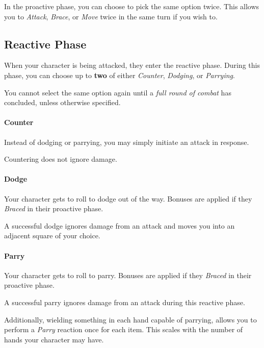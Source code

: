 \begin{note} 
  In the proactive phase, you can choose to pick the same option twice. 
  This allows you to \textit{Attack}, \textit{Brace}, or \textit{Move} twice in the same turn if you wish to.
\end{note}

\subsection{Reactive Phase}
When your character is being attacked, they enter the reactive phase.
During this phase, you can choose up to \textbf{two} of either \textit{Counter}, \textit{Dodging}, or \textit{Parrying}.

You cannot select the same option again until a \textit{full round of combat} has concluded, unless otherwise specified.

\paragraph{Counter}
Instead of dodging or parrying, you may simply initiate an attack in response.

Countering does not ignore damage.

\paragraph{Dodge}
Your character gets to roll to dodge out of the way.
Bonuses are applied if they \textit{Braced} in their proactive phase.

A successful dodge ignores damage from an attack and moves you into an adjacent square of your choice.

\paragraph{Parry}
Your character gets to roll to parry.
Bonuses are applied if they \textit{Braced} in their proactive phase.

A successful parry ignores damage from an attack during this reactive phase.

Additionally, wielding something in each hand capable of parrying, allows you to perform a \textit{Parry} reaction once for each item.
This scales with the number of hands your character may have.